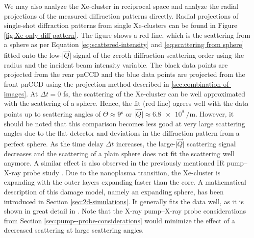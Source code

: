 We may also analyze the Xe-cluster in reciprocal space and analyze the radial projections of the measured diffraction patterns directly. Radial projections of single-shot diffraction patterns from single Xe-clusters can be found in Figure \ref{fig:Xe-only-diff-pattern}. The figure shows a red line, which is the scattering from a sphere as per Equation \eqref{eq:scattered-intensity} and \eqref{eq:scattering from sphere} fitted onto the low-$\lvert\vec{Q}\rvert$ signal of the zeroth diffraction scattering order using the radius and the incident beam intensity variable. The black data points are projected from the rear pnCCD and the blue data points are projected from the front pnCCD using the projection method described in \ref{sec:combination-of-images}. At $\Delta t=0$ fs, the scattering of the Xe-cluster can be well approximated with the scattering of a sphere. Hence, the fit (red line) agrees well with the data points up to scattering angles of $\Theta \approx 9$° or $\lvert\vec{Q}\rvert\approx\SI{6.8e8}{\per\meter}$. However, it should be noted that this comparison becomes less good at very large scattering angles due to the flat detector \citep{Bostedt-2012-PRL} and deviations in the diffraction pattern from a perfect sphere. As the time delay $\Delta t$ increases, the large-$\lvert\vec{Q}\rvert$ scattering signal decreases and the scattering of a plain sphere does not fit the scattering well anymore. A similar effect is also observed in the previously mentioned IR pump--X-ray probe study \citep{Gorkhover-2016-NatPho}. Due to the nanoplasma transition, the Xe-cluster is expanding with the outer layers expanding faster than the core. A mathematical description of this damage model, namely an expanding sphere, has been introduced in Section \ref{sec:2d-simulations}. It generally fits the data well, as it is shown in great detail in \citep{Gorkhover-2016-NatPho,Gorkhover-2014-Thesis}. Note that the X-ray pump--X-ray probe considerations from Section \ref{sec:pump--probe-considerations} would minimize the effect of a decreased scattering at large scattering angles.
%
%
%
